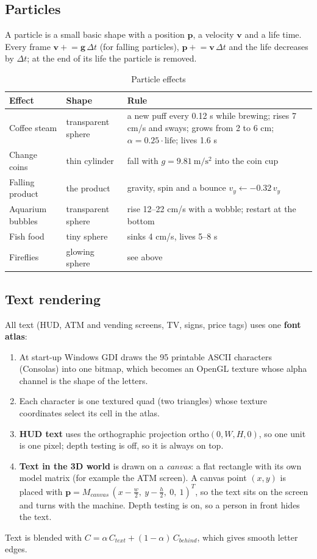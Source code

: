 \subsection{Particles}\label{sec:particles}
A particle is a small basic shape with a position $\mathbf{p}$, a velocity $\mathbf{v}$ and a life time. Every frame
$\mathbf{v} \mathrel{+}= \mathbf{g}\,\Delta t$ (for falling particles), $\mathbf{p} \mathrel{+}= \mathbf{v}\,\Delta t$ and the life decreases
by $\Delta t$; at the end of its life the particle is removed.
\begin{table}[H]
\centering\small
\caption{Particle effects}\label{tab:particles}
\begin{tabularx}{\linewidth}{@{}P{2.6cm}P{2.6cm}X@{}}
\toprule
Effect & Shape & Rule \\ \midrule
Coffee steam & transparent sphere & a new puff every 0.12 s while brewing; rises 7 cm/s and sways; grows from 2 to 6 cm; $\alpha = 0.25\cdot\text{life}$; lives 1.6 s \\
Change coins & thin cylinder & fall with $g=9.81\ \mathrm{m/s^2}$ into the coin cup \\
Falling product & the product & gravity, spin and a bounce $v_y \leftarrow -0.32\,v_y$ \\
Aquarium bubbles & transparent sphere & rise 12--22 cm/s with a wobble; restart at the bottom \\
Fish food & tiny sphere & sinks 4 cm/s, lives 5--8 s \\
Fireflies & glowing sphere & see above \\
\bottomrule
\end{tabularx}
\end{table}

\subsection{Text rendering}\label{sec:text}
All text (HUD, ATM and vending screens, TV, signs, price tags) uses one \textbf{font atlas}:
\begin{enumerate}
  \item At start-up Windows GDI draws the 95 printable ASCII characters (Consolas) into one bitmap, which becomes an
        OpenGL texture whose alpha channel is the shape of the letters.
  \item Each character is one textured quad (two triangles) whose texture coordinates select its cell in the atlas.
  \item \textbf{HUD text} uses the orthographic projection $\text{ortho}(0,W,H,0)$, so one unit is one pixel; depth
        testing is off, so it is always on top.
  \item \textbf{Text in the 3D world} is drawn on a \emph{canvas}: a flat rectangle with its own model matrix (for
        example the ATM screen). A canvas point $(x,y)$ is placed with
        $\mathbf{p} = M_{canvas}\,(x-\tfrac{w}{2},\ y-\tfrac{h}{2},\ 0,\ 1)^T$, so the text sits on the screen and turns
        with the machine. Depth testing is on, so a person in front hides the text.
\end{enumerate}
Text is blended with $C = \alpha\,C_{text} + (1-\alpha)\,C_{behind}$, which gives smooth letter edges.

